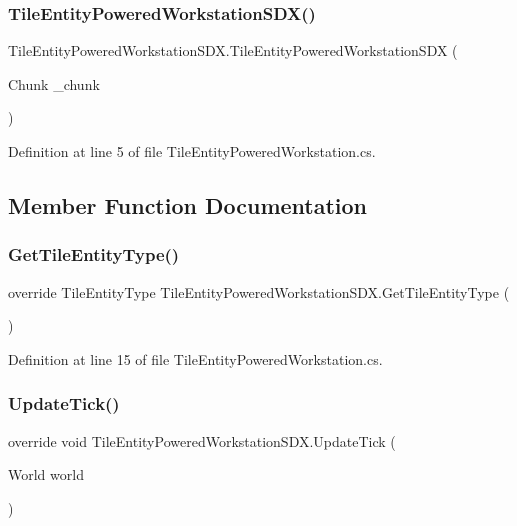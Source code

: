 \subsubsection{\texorpdfstring{TileEntityPoweredWorkstationSDX()}{TileEntityPoweredWorkstationSDX()}}
{\footnotesize\ttfamily Tile\+Entity\+Powered\+Workstation\+S\+D\+X.\+Tile\+Entity\+Powered\+Workstation\+S\+DX (\begin{DoxyParamCaption}\item[{Chunk}]{\+\_\+chunk }\end{DoxyParamCaption})}



Definition at line 5 of file Tile\+Entity\+Powered\+Workstation.\+cs.



\subsection{Member Function Documentation}
\mbox{\label{class_tile_entity_powered_workstation_s_d_x_a061cabab272b38180da470223feeeb5d}} 
\subsubsection{\texorpdfstring{GetTileEntityType()}{GetTileEntityType()}}
{\footnotesize\ttfamily override Tile\+Entity\+Type Tile\+Entity\+Powered\+Workstation\+S\+D\+X.\+Get\+Tile\+Entity\+Type (\begin{DoxyParamCaption}{ }\end{DoxyParamCaption})}



Definition at line 15 of file Tile\+Entity\+Powered\+Workstation.\+cs.

\mbox{\label{class_tile_entity_powered_workstation_s_d_x_a7bdf58d110502b7e49b3fa83d566b40e}} 
\subsubsection{\texorpdfstring{UpdateTick()}{UpdateTick()}}
{\footnotesize\ttfamily override void Tile\+Entity\+Powered\+Workstation\+S\+D\+X.\+Update\+Tick (\begin{DoxyParamCaption}\item[{World}]{world }\end{DoxyParamCaption})}



